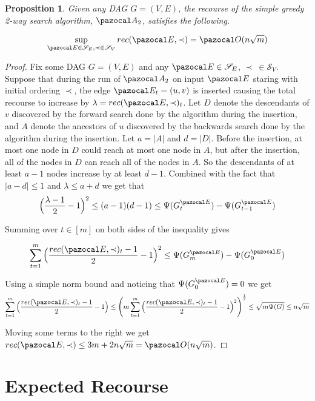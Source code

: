 \documentclass{report}
\newtheorem{proposition}{Proposition}
\begin{document}
\begin{proposition}
Given any DAG $G=(V,E)$, the recourse of the simple greedy 2-way search algorithm, $\pazocal A_2$, satisfies the following.

\[ \sup_{\pazocal E \in \mathcal S_E, \prec \in \mathcal S_V} rec(\pazocal E, \prec) =  \pazocal O (n \sqrt m) \]
\end{proposition}

\begin{proof}

Fix some DAG $G=(V,E)$ and any $\pazocal E \in \mathcal S_E$, $\prec \: \in \mathcal S_V$. Suppose that during the run of $\pazocal A_2$ on input $\pazocal E$ staring with initial ordering $\prec$, the edge $\pazocal E_t = (u,v)$ is inserted causing the total recourse to increase by $\lambda = rec(\pazocal E, \prec)_t$. Let $D$ denote the descendants of $v$ discovered by the forward search done by the algorithm during the insertion, and $A$ denote the ancestors of $u$ discovered by the backwards search done by the algorithm during the insertion. Let $a = \vert A \vert$ and $d = \vert D \vert$. Before the insertion, at most one node in $D$ could reach at most one node in $A$, but after the insertion, all of the nodes in $D$ can reach all of the nodes in $A$. So the descendants of at least $a-1$ nodes increase by at least $d - 1$. Combined with the fact that $\vert a - d \vert \leq 1$ and $\lambda \leq a + d$ we get that
\[ \Big (\frac{\lambda - 1}{2} - 1 \Big )^2 \leq (a-1)(d-1) \leq \Psi(G^{\pazocal E}_t) - \Psi(G^{\pazocal E}_{t-1}) \]

Summing over $t \in [m]$ on both sides of the inequality gives

\[ \sum_{t=1}^m \Big (\frac{rec(\pazocal E, \prec)_t - 1}{2} - 1 \Big )^2 \leq \Psi(G^{\pazocal E}_m) - \Psi(G^{\pazocal E}_{0}) \]

Using a simple norm bound and noticing that $\Psi(G_{0}^{\pazocal E})=0$ we get
\[ \sum_{t=1}^m \Big (\frac{rec(\pazocal E, \prec)_t - 1}{2} - 1 \Big ) \leq \Bigg (m \sum_{t=1}^m \Big (\frac{rec(\pazocal E, \prec)_t - 1}{2} - 1 \Big )^2 \Bigg )^{\frac{1}{2}} \leq \sqrt{m\Psi(G)} \leq n \sqrt m \]

Moving some terms to the right we get $rec(\pazocal E, \prec) \leq 3m + 2n \sqrt m = \pazocal O (n \sqrt m)$.
\end{proof}

\section{Expected Recourse}
\end{document}
